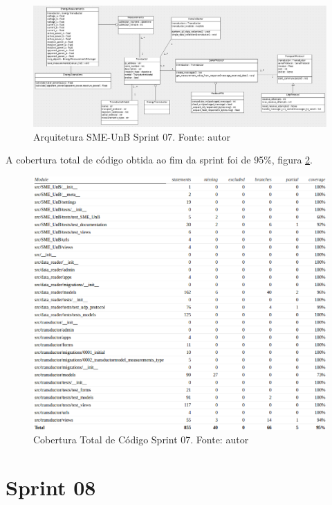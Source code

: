 \begin{figure}[!htpb]
    \centering
    \includegraphics[scale=0.4,angle=90]{figuras/sprint07arq.eps}
    \caption{Arquitetura SME-UnB Sprint 07. Fonte: autor}
    \label{sprint07arq}
\end{figure}

A cobertura total de código obtida ao fim da sprint foi de 95\%, figura \ref{cobertura04}.
\begin{figure}[!htpb]
    \centering
    \includegraphics[keepaspectratio=true,scale=0.5]{figuras/cobertura04.eps}
    \caption{Cobertura Total de Código Sprint 07. Fonte: autor}
    \label{cobertura04}
\end{figure}

\section{Sprint 08}
